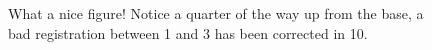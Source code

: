 \begin{figure}[htbp]
    \caption{What a nice figure! Notice a quarter of the way up from the base, a bad registration between 1 and 3 has been corrected in 10.}
    \label{fig:dummy_cross_sections}
  \end{figure}
  
